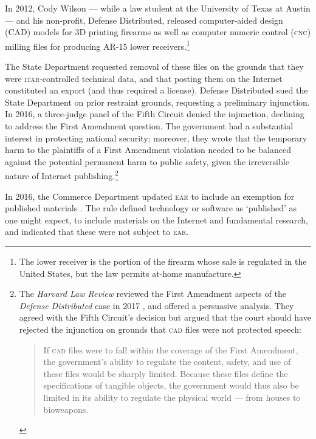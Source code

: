 \documentclass[12pt]{olfmemo}
\begin{document}
In 2012, Cody Wilson --- while a law student at the University of Texas at Austin --- and his non-profit, Defense Distributed, released computer-aided design (CAD) models for 3D printing firearms as well as computer numeric control (\textsc{cnc}) milling files for producing AR-15 lower receivers.\footnote{The lower receiver is the portion of the firearm whose sale is regulated in the United States, but the law permits at-home manufacture.}

The State Department requested removal of these files on the grounds that they were \textsc{itar}-controlled technical data, and that posting them on the Internet constituted an export (and thus required a license). Defense Distributed sued the State Department on prior restraint grounds, requesting a preliminary injunction. In 2016, a three-judge panel of the Fifth Circuit denied the injunction, declining to address the First Amendment question. The government had a substantial interest in protecting national security; moreover, they wrote that the temporary harm to the plaintiffs of a First Amendment violation needed to be balanced against the potential permanent harm to public safety, given the irreversible nature of Internet publishing.\footnote{The \textit{Harvard Law Review} reviewed the First Amendment aspects of the \textit{Defense Distributed} case in 2017 \citep{Harvard2017}, and offered a persuasive analysis. They agreed with the Fifth Circuit's decision but argued that the court should have rejected the injunction on grounds that \textsc{cad} files were not protected speech:
\begin{quote}
If \textsc{cad} files were to fall within the coverage of the First Amendment, the government's ability to regulate the content, safety, and use of these files would be sharply limited. Because these files define the specifications of tangible objects, the government would thus also be limited in its ability to regulate the physical world --- from houses to bioweapons.
\end{quote}} \citep{DefenseDistributed2016}

In 2016, the Commerce Department updated \textsc{ear} to include an exemption for published materials \citep{PublishedRule2016}. The rule defined technology or software as `published' as one might expect, to include materials on the Internet and fundamental research, and indicated that these were not subject to \textsc{ear}.
\end{document}
